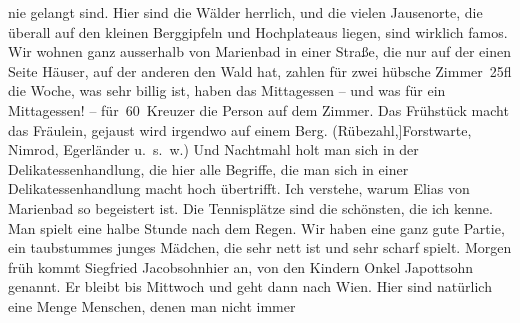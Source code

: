 \begin{ledgroupsized}[t]{13cm}
               nie gelangt sind. Hier sind die Wälder herrlich, und die vielen Jausenorte, die
               überall auf den kleinen Berggipfeln und Hochplateaus liegen, sind wirklich famos. Wir
               wohnen ganz ausserhalb von Marienbad in einer
               Straße, die nur auf der einen Seite Häuser, auf der anderen den Wald hat, zahlen für
               zwei hübsche Zimmer 25fl die Woche, was sehr billig ist, haben das Mittagessen – und
               was für ein Mittagessen! – für 60 Kreuzer die Person auf dem Zimmer. Das Frühstück
               macht das 
               Fräulein, gejaust wird
               irgendwo auf einem Berg. (Rübezahl\oindex{Hotel Ruebezahl@\textbf{Hotel Rübezahl}|pw}{[},{]}Forstwarte, Nimrod, Egerländer u. s. w.) Und
               Nachtmahl holt man sich in der 
               Delikatessenhandlung, die hier alle
               Begriffe, die man sich in einer Delikatessenhandlung macht hoch
               übertrifft. Ich verstehe, warum Elias von Marienbad so begeistert {\pb}ist. Die Tennisplätze sind die
               schönsten, die ich kenne. Man spielt eine halbe Stunde nach dem Regen. Wir haben eine
               ganz gute Partie, ein taubstummes junges 
               Mädchen, die sehr nett
               ist und sehr scharf spielt. Morgen{ }früh kommt Siegfried Jacobsohnhier an, von den Kindern Onkel Japottsohn genannt. Er bleibt bis Mittwoch und geht dann nach Wien. Hier sind natürlich eine Menge Menschen, denen man nicht immer

\end{ledgroupsized}
